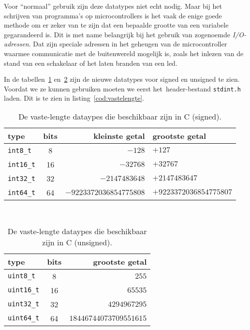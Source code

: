 Voor ``normaal'' gebruik zijn deze datatypes niet echt nodig. Maar bij het schrijven van programma's op microcontrollers is het vaak de enige goede methode om er zeker van te zijn dat een bepaalde grootte van een variabele gegarandeerd is. Dit is met name belangrijk bij het gebruik van zogenoemde \textsl{I/O-adressen}. Dat zijn speciale adressen in het geheugen van de microcontroller waarmee communicatie met de buitenwereld mogelijk is, zoals het inlezen van de stand van een schakelaar of het laten branden van een led.

In de tabellen~\ref{tab:varinttdatatypes} en~\ref{tab:varuinttdatatypes} zijn de nieuwe datatypes voor signed en unsigned te zien. Voordat we ze kunnen gebruiken moeten we eerst het\ header-bestand \texttt{stdint.h} laden. Dit is te zien in listing~\ref{cod:vastelengte}.

\begin{table}[!ht]
\centering
\caption{De vaste-lengte dataypes die beschikbaar zijn in C (signed).}
\label{tab:varinttdatatypes}
\begin{tabular}{@{}lcrl@{}}
\toprule
\textbf{type}          & \textbf{bits} & \textbf{kleinste getal} &  \textbf{grootste getal} \\ \midrule
\texttt{int8\_t}       & 8             & $-128$                  & $+127$  \\
\texttt{int16\_t}      & 16            & $-32768$                & $+32767$  \\
\texttt{int32\_t}      & 32            & $-2147483648$           & $+2147483647$  \\
\texttt{int64\_t}      & 64            & $-9223372036854775808$  & $+9223372036854775807$  \\
\bottomrule
\end{tabular}\\
\end{table}

\begin{table}[!ht]
\centering
\caption{De vaste-lengte dataypes die beschikbaar zijn in C (unsigned).}
\label{tab:varuinttdatatypes}
\begin{tabular}{@{}lcr@{}}
\toprule
\textbf{type}          & \textbf{bits} & \textbf{grootste getal} \\ \midrule
\texttt{uint8\_t}       & 8             & $255$                   \\
\texttt{uint16\_t}      & 16            & $65535$                 \\
\texttt{uint32\_t}      & 32            & $4294967295$            \\
\texttt{uint64\_t}      & 64            & $18446744073709551615$   \\
\bottomrule
\end{tabular}\\
\end{table}

